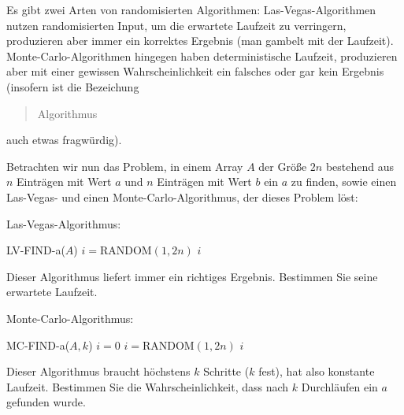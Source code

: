 
\begin{exercise}

Es gibt zwei Arten von randomisierten Algorithmen:
Las-Vegas-Algorithmen nutzen randomisierten Input, um die erwartete Laufzeit zu verringern, produzieren aber immer ein korrektes Ergebnis (man gambelt mit der Laufzeit).
Monte-Carlo-Algorithmen hingegen haben deterministische Laufzeit, produzieren aber mit einer gewissen Wahrscheinlichkeit ein falsches oder gar kein Ergebnis (insofern ist die Bezeichung \blockquote{Algorithmus} auch etwas fragwürdig).

Betrachten wir nun das Problem, in einem Array $A$ der Größe $2 n$ bestehend aus $n$ Einträgen mit Wert $a$ und $n$ Einträgen mit Wert $b$ ein $a$ zu finden, sowie einen Las-Vegas- und einen Monte-Carlo-Algorithmus, der dieses Problem löst:

\phantom{}

Las-Vegas-Algorithmus:

\begin{algorithmic}
    \State LV-FIND-a($A$)
        \State $i = \text{RANDOM}(1, 2 n)$
            \State \Return $i$
        \EndIf
    \EndWhile
\end{algorithmic}

\phantom{}

Dieser Algorithmus liefert immer ein richtiges Ergebnis.
Bestimmen Sie seine erwartete Laufzeit.

\phantom{}

Monte-Carlo-Algorithmus:

\begin{algorithmic}
    \State MC-FIND-a($A, k$)
    \State $i = 0$
        \State $i = \text{RANDOM}(1, 2 n)$
            \State \Return $i$
        \EndIf
    \EndWhile
\end{algorithmic}

\phantom{}

Dieser Algorithmus braucht höchstens $k$ Schritte ($k$ fest), hat also konstante Laufzeit.
Bestimmen Sie die Wahrscheinlichkeit, dass nach $k$ Durchläufen ein $a$ gefunden wurde.

\end{exercise}

